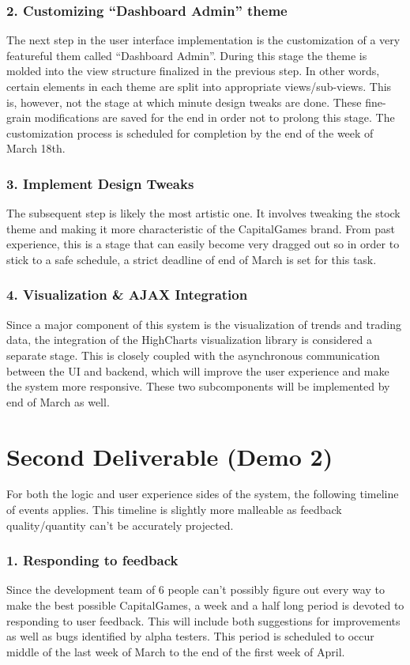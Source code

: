 \subsubsection{2. Customizing “Dashboard Admin” theme}
The next step in the user interface implementation is the customization of a very featureful them called “Dashboard Admin”. During this stage the theme is molded into the view structure finalized in the previous step. In other words, certain elements in each theme are split into appropriate views/sub-views. This is, however, not the stage at which minute design tweaks are done. These fine-grain modifications are saved for the end in order not to prolong this stage. The customization process is scheduled for completion by the end of the week of March 18th. \\
\subsubsection{3. Implement Design Tweaks}
The subsequent step is likely the most artistic one. It involves tweaking the stock theme and making it more characteristic of the CapitalGames brand. From past experience, this is a stage that can easily become very dragged out so in order to stick to a safe schedule, a strict deadline of end of March is set for this task. \\
\subsubsection{4. Visualization \& AJAX Integration}
Since a major component of this system is the visualization of trends and trading data, the integration of the HighCharts visualization library is considered a separate stage. This is closely coupled with the asynchronous communication between the UI and backend, which will improve the user experience and make the system more responsive. These two subcomponents will be implemented by end of March as well.\\

\section{Second Deliverable (Demo 2)}
For both the logic and user experience sides of the system, the following timeline of events applies. This timeline is slightly more malleable as feedback quality/quantity can’t be accurately projected. \\
\subsubsection{1. Responding to feedback}
Since the development team of 6 people can’t possibly figure out every way to make the best possible CapitalGames, a week and a half long period is devoted to responding to user feedback. This will include both suggestions for improvements as well as bugs identified by alpha testers. This period is scheduled to occur middle of the last week of March to the end of the first week of April. \\
